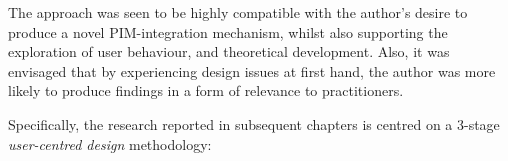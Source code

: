 
The approach was seen to be highly compatible with the author's desire to produce a novel PIM-integration mechanism, whilst also supporting the exploration of user behaviour, and theoretical development.  Also, it was envisaged that by experiencing design issues at first hand, the author was more likely to produce findings in a form of relevance to practitioners. %





\newpage
Specifically, the research reported in subsequent chapters is centred on a 3-stage \textit{user-centred design} methodology:

